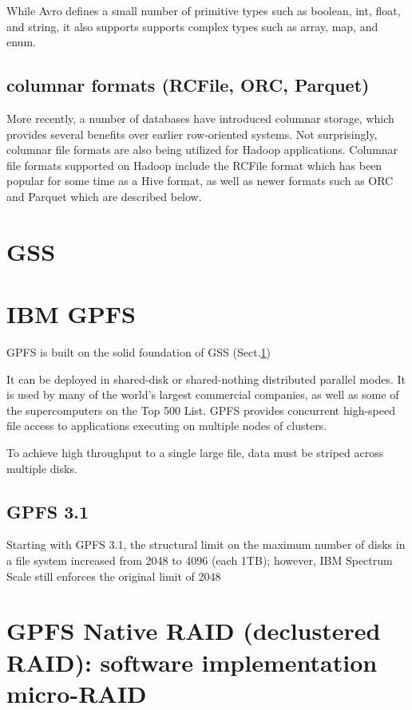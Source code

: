 While Avro defines a small number of primitive types such as boolean, int,
float, and string, it also supports supports complex types such as array, map, and enum.

\subsection{columnar formats (RCFile, ORC, Parquet)}

More recently, a number of databases have introduced columnar storage, which
provides several benefits over earlier row-oriented systems. Not surprisingly,
columnar file formats are also being utilized for Hadoop applications. Columnar
file formats supported on Hadoop include the RCFile format  which has been
popular for some time as a Hive format, as well as newer formats such as ORC and
Parquet which are described below. 



\section{GSS}
\label{sec:GSS}


\section{IBM GPFS}

GPFS is built on the solid foundation of GSS (Sect.\ref{sec:GSS})

It can be deployed in shared-disk or shared-nothing distributed parallel modes.
It is used by many of the world's largest commercial companies, as well as some
of the supercomputers on the Top 500 List. GPFS provides concurrent high-speed
file access to applications executing on multiple nodes of clusters.

To achieve high throughput to a single large file, data
must be striped across multiple disks.

\subsection{GPFS 3.1}

Starting with GPFS 3.1, the structural limit on the maximum number of disks in
a file system increased from 2048 to 4096 (each 1TB); however, IBM Spectrum
Scale still enforces the original limit of 2048 

\section{GPFS Native RAID (declustered RAID): software implementation
micro-RAID}

